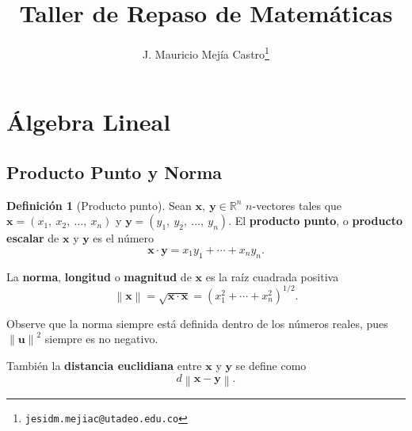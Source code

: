 \documentclass[11pt,letterpaper]{article}
\author{J. Mauricio Mej{\'i}a Castro\thanks{\tt jesidm.mejiac@utadeo.edu.co}}
\title{Taller de Repaso de Matemáticas}
\affil{Universidad Jorge Tadeo Lozano}
\newcommand{\upla}[2]{(#1_1,\ #1_2,\ \ldots,\ #1_{#2})}
\theoremstyle{plain}
\theoremstyle{definition}
\newtheorem{defi}{Definición}[section]
\theoremstyle{remark}
\begin{document}
\maketitle
\newpage

\section{Álgebra Lineal}
	\subsection{Producto Punto y Norma}
\begin{defi}[Producto punto] Sean %
$\mathbf{x},\ \mathbf{y} \in \mathbb{R}^{n}$ $n$-vectores tales que %
$\mathbf{x} = \upla{x}{n}$ y $\mathbf{y} = \upla{y}{n}$. %
El {\bf producto punto}, o {\bf producto escalar} de $\mathbf{x}$ y %
$\mathbf{y}$ es el número
	\begin{equation}
	\mathbf{x}\cdot \mathbf{y} = x_1y_1+\cdots +x_ny_n.
	\end{equation}
\par La {\bf norma}, {\bf longitud} o {\bf magnitud} de $\mathbf{x}$ es la raíz %
cuadrada positiva
	\begin{equation}
	\left\| \mathbf{x} \right\| = \sqrt{ \mathbf{x} \cdot \mathbf{x} } %
	= \left( x^2_1 + \cdots + x^2_n \right)^{1/2}.
	\end{equation}
\par 
Observe que la norma siempre está definida dentro de los números reales, pues $\left\|\mathbf{u}\right\|^2$ %
siempre es no negativo.
\par También la {\bf distancia euclidiana} entre $\mathbf{x}$ y $\mathbf{y}$ %
se define como 
	\begin{equation}
	d  \left\| \mathbf{x} - \mathbf{y} \right\|.
	\end{equation}
\end{defi}
\end{document}
